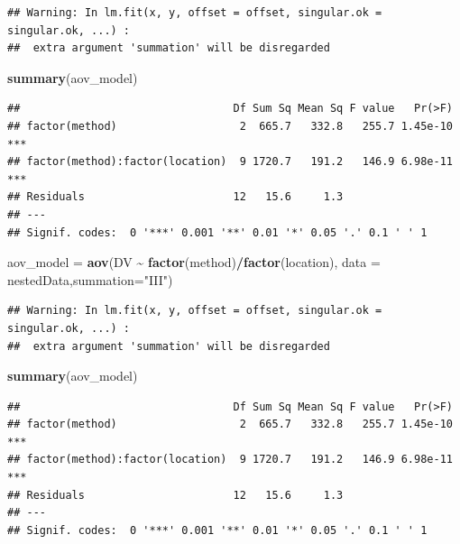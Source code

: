 \documentclass[
]{ctexart}
\newenvironment{Shaded}{\begin{snugshade}}{\end{snugshade}}
\newcommand{\AttributeTok}[1]{\textcolor[rgb]{0.13,0.29,0.53}{#1}}
\newcommand{\FunctionTok}[1]{\textcolor[rgb]{0.13,0.29,0.53}{\textbf{#1}}}
\newcommand{\NormalTok}[1]{#1}
\newcommand{\OtherTok}[1]{\textcolor[rgb]{0.56,0.35,0.01}{#1}}
\newcommand{\SpecialCharTok}[1]{\textcolor[rgb]{0.81,0.36,0.00}{\textbf{#1}}}
\newcommand{\StringTok}[1]{\textcolor[rgb]{0.31,0.60,0.02}{#1}}
\begin{document}
\begin{verbatim}
## Warning: In lm.fit(x, y, offset = offset, singular.ok = singular.ok, ...) :
##  extra argument 'summation' will be disregarded
\end{verbatim}

\begin{Shaded}
\begin{Highlighting}[]
\FunctionTok{summary}\NormalTok{(aov\_model)}
\end{Highlighting}
\end{Shaded}

\begin{verbatim}
##                                 Df Sum Sq Mean Sq F value   Pr(>F)    
## factor(method)                   2  665.7   332.8   255.7 1.45e-10 ***
## factor(method):factor(location)  9 1720.7   191.2   146.9 6.98e-11 ***
## Residuals                       12   15.6     1.3                     
## ---
## Signif. codes:  0 '***' 0.001 '**' 0.01 '*' 0.05 '.' 0.1 ' ' 1
\end{verbatim}

\begin{Shaded}
\begin{Highlighting}[]
\NormalTok{aov\_model }\OtherTok{=} \FunctionTok{aov}\NormalTok{(DV }\SpecialCharTok{\textasciitilde{}} \FunctionTok{factor}\NormalTok{(method)}\SpecialCharTok{/}\FunctionTok{factor}\NormalTok{(location), }
                \AttributeTok{data =}\NormalTok{ nestedData,}\AttributeTok{summation=}\StringTok{"III"}\NormalTok{)}
\end{Highlighting}
\end{Shaded}

\begin{verbatim}
## Warning: In lm.fit(x, y, offset = offset, singular.ok = singular.ok, ...) :
##  extra argument 'summation' will be disregarded
\end{verbatim}

\begin{Shaded}
\begin{Highlighting}[]
\FunctionTok{summary}\NormalTok{(aov\_model)}
\end{Highlighting}
\end{Shaded}

\begin{verbatim}
##                                 Df Sum Sq Mean Sq F value   Pr(>F)    
## factor(method)                   2  665.7   332.8   255.7 1.45e-10 ***
## factor(method):factor(location)  9 1720.7   191.2   146.9 6.98e-11 ***
## Residuals                       12   15.6     1.3                     
## ---
## Signif. codes:  0 '***' 0.001 '**' 0.01 '*' 0.05 '.' 0.1 ' ' 1
\end{verbatim}
\end{document}
